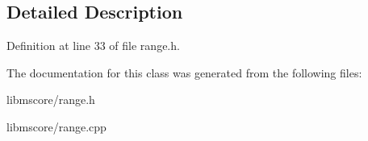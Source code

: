 \subsection{Detailed Description}


Definition at line 33 of file range.\+h.



The documentation for this class was generated from the following files\+:\begin{DoxyCompactItemize}
\item 
libmscore/range.\+h\item 
libmscore/range.\+cpp\end{DoxyCompactItemize}
